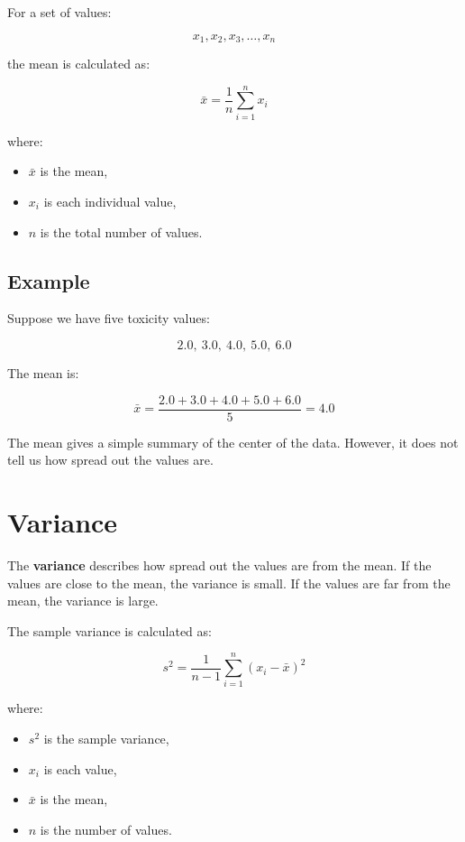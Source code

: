 \documentclass[11pt]{report}
\newenvironment{Important note}{\begin{quote}\color{red}\textbf{Important note:} }{\end{quote}}
\begin{document}
For a set of values:

\[
x_1, x_2, x_3, \ldots, x_n
\]

the mean is calculated as:

\[
\bar{x} = \frac{1}{n}\sum_{i=1}^{n}x_i
\]

where:

\begin{itemize}[leftmargin=*]
    \item $\bar{x}$ is the mean,
    \item $x_i$ is each individual value,
    \item $n$ is the total number of values.
\end{itemize}

\subsection*{Example}

Suppose we have five toxicity values:

\[
2.0,\ 3.0,\ 4.0,\ 5.0,\ 6.0
\]

The mean is:

\[
\bar{x} = \frac{2.0 + 3.0 + 4.0 + 5.0 + 6.0}{5} = 4.0
\]

The mean gives a simple summary of the center of the data. However, it does not tell us how spread out the values are.

\section{Variance}

The \textbf{variance} describes how spread out the values are from the mean. If the values are close to the mean, the variance is small. If the values are far from the mean, the variance is large.

The sample variance is calculated as:

\[
s^2 = \frac{1}{n-1}\sum_{i=1}^{n}(x_i - \bar{x})^2
\]

where:

\begin{itemize}[leftmargin=*]
    \item $s^2$ is the sample variance,
    \item $x_i$ is each value,
    \item $\bar{x}$ is the mean,
    \item $n$ is the number of values.
\end{itemize}
\end{document}

